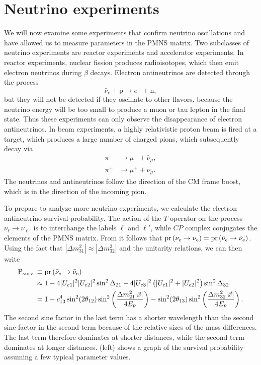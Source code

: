 \section{Neutrino experiments}
We will now examine some experiments that confirm neutrino oscillations and
have allowed us to measure parameters in the PMNS matrix.
Two subclasses of neutrino experiments are reactor experiments
and accelerator experiments. In reactor experiments, nuclear fission produces
radioisotopes, which then emit electron neutrinos during $\beta$ decays.
Electron antineutrinos are detected through the process
\begin{equation}
  \label{eq:betadecay}
  \bar{\nu}_e+\text{p}\to e^++\text{n},
\end{equation}
but they will not be detected if they oscillate to other flavors, because
the neutrino energy will be too small to produce a muon or tau lepton in
the final state. Thus these experiments can only observe the disappearance
of electron antineutrinos. In beam experiments, a highly relativistic
proton beam is fired at a target, which produces a large number of charged
pions, which subsequently decay via
\begin{equation}
  \begin{aligned}
    \pi^-&\to\mu^-+\bar{\nu}_\mu, \\
    \pi^+&\to\mu^++\nu_\mu.
  \end{aligned}
\end{equation}
The neutrinos and antineutrinos follow the direction of the CM frame boost,
which is in the direction of the incoming pion.

To prepare to analyze more neutrino experiments, we calculate the
electron antineutrino survival probability.
The action of the $T$ operator on the process $\nu_\ell\to\nu_{\ell'}$ is
to interchange the labels $\ell$ and $\ell'$, while $CP$ complex conjugates
the elements of the PMNS matrix. From  it follows
that $\pr{\nu_e\to\nu_e}=\pr{\bar{\nu}_e\to\bar{\nu}_e}$. Using the fact
that $|\Delta m_{31}^2|\approx|\Delta m_{32}^2|$ and the unitarity relations,
we can then write
\begin{equation}
  \label{eq:prb}
  \begin{aligned}
    {\rm P}_{\rm surv.}&\equiv\pr{\bar{\nu}_e\to\bar{\nu}_e}\\
      &\approx 1-4|U_{e1}|^2|U_{e2}|^2\sin^2\Delta_{21}
              -4|U_{e3}|^2\left(|U_{e1}|^2+|U_{e2}|^2\right)\sin^2\Delta_{32}
       \\ 
      &= 1-c_{13}^4\sin^2(2\theta_{12})
           \sin^2\left(\frac{\Delta m_{21}^2 |\vec{x}|}{4E_{\bar{\nu}}}
           \right) -\sin^2(2\theta_{13})
           \sin^2\left(\frac{\Delta m_{32}^2 |\vec{x}|}{4E_{\bar{\nu}}}
           \right).
  \end{aligned}
\end{equation}
The second sine factor in the last term has a shorter wavelength than the
second sine factor in the second term because of the relative sizes of the
mass differences. The last term therefore dominates at shorter distances,
while the second term dominates at longer distances. 
(left) shows a graph of the survival probability assuming a few typical 
parameter values.

